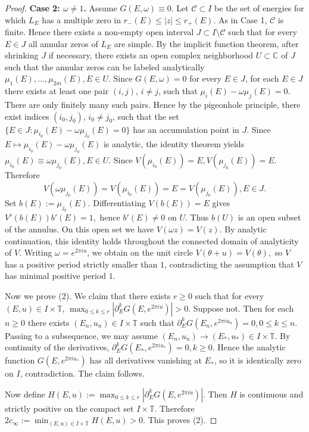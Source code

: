 \documentclass[reqno,11pt]{amsart}
\begin{document}
\begin{proof}
{\bf Case 2: $\omega\neq 1$.}
Assume $G(E,\omega)\equiv 0$.
Let $\mathcal C\subset I$ be the set of energies for which $L_{E}$ has a multiple zero in $r_-(E)\leq|z|\leq r_+(E)$. As in Case 1, $\mathcal C$ is finite. Hence there exists a non-empty open interval $J\subset I\setminus \mathcal C$ such that for every $E\in J$ all annular zeros of $L_{E}^{}$ are simple. By the implicit function theorem,  after shrinking $J$ if necessary, there exists an open complex neighborhood $U\subset\mathbb C$ of $J$ such that the annular zeros can be labeled analytically $\mu_1(E),\dots,\mu_{2m}(E), E\in U$.
Since $G(E,\omega)=0$ for every $E\in J$, for each $E\in J$ there exists at least one pair $(i,j)$, $i\neq j$, such that
$
\mu_i(E)-\omega \mu_j(E)=0.
$
There are only finitely many such pairs. Hence by the pigeonhole principle, there exist indices $(i_0,j_0)$, $i_0\neq j_0$, such that the set
$
\{E\in J: \mu_{i_0}(E)-\omega \mu_{j_0}(E)=0\}
$
has an accumulation point in $J$. Since $E\mapsto \mu_{i_0}(E)-\omega \mu_{j_0}(E)$
is analytic, the identity theorem yields $\mu_{i_0}(E)\equiv \omega \mu_{j_0}(E), E\in U.$
Since $V(\mu_{i_0}(E))=E, V(\mu_{j_0}(E))=E.$
Therefore $$
V(\omega \mu_{j_0}(E))=V(\mu_{i_0}(E))=E=V(\mu_{j_0}(E)), E\in J.
$$
Set
$
b(E):=\mu_{j_0}(E).
$
Differentiating $V(b(E))=E$ gives $V'(b(E))  b'(E)=1,$ hence $b'(E)\neq 0$ on $U$. Thus $b(U)$ is an open subset of the annulus. On this open set we have $V(\omega z)=V(z).$
By analytic continuation, this identity holds throughout the connected domain of analyticity of $V$. 
Writing $\omega=e^{2\pi i u}$, we obtain on the unit circle $V(\theta+u)=V(\theta),$ so $V$ has a positive period strictly smaller than $1$,
contradicting the assumption that $V$ has minimal positive period $1$.

Now we prove (2). We claim that there exists $r\ge 0$ such that for every $(E,u)\in I\times\mathbb T$,
$
\max_{0\le k\le r}\left|\partial_E^k G(E,e^{2\pi i u})\right|>0.
$
Suppose not. Then for each $n\ge 0$ there exists $(E_n,u_n)\in I\times\mathbb T$ such that
$
\partial_E^k G(E_n,e^{2\pi i u_n})=0, 0\le k\le n.
$
Passing to a subsequence, we may assume
$
(E_n,u_n)\to(E_*,u_*)\in I\times\mathbb T.
$
By continuity of the derivatives,
$\partial_E^k G(E_*,e^{2\pi i u_*})=0, k\ge 0.$
Hence the analytic function $ G(E,e^{2\pi i u_*})$
has all derivatives vanishing at $E_*$, so it is identically zero on $I$, contradiction. The claim follows.

Now define $H(E,u):=\max_{0\le k\le r}\left|\partial_E^k G(E,e^{2\pi i u})\right|.$
Then $H$ is continuous and strictly positive on the compact set $I\times\mathbb T$. Therefore
$2c_\infty:=\min_{(E,u)\in I\times\mathbb T} H(E,u)>0.$
This proves (2).
\end{proof}
\end{document}
